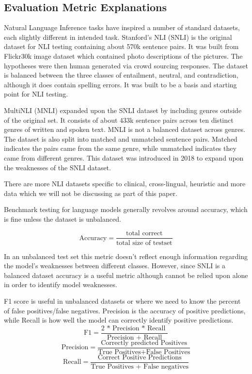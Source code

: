 \documentclass[11pt]{article}
\begin{document}
\subsection{Evaluation Metric Explanations}
Natural Language Inference tasks have inspired a number of standard datasets, each slightly different in intended task.  Stanford's NLI (SNLI) is the original dataset for NLI testing containing about 570k sentence pairs.  It was built from Flickr30k image dataset which contained photo descriptions of the pictures.  The hypotheses were then human generated via crowd sourcing responses. The dataset is balanced between the three classes of entailment, neutral, and contradiction, although it does contain spelling errors.  It was built to be a basis and starting point for NLI testing. \citealp{dataAug}

MultiNLI (MNLI) expanded upon the SNLI dataset by including genres outside of the original set. It consists of about 433k sentence pairs across ten distinct genres of written and spoken text. MNLI is not a balanced dataset across genres. The dataset is also split into matched and unmatched sentence pairs. Matched indicates the pairs came from the same genre, while unmatched indicates they came from different genres.  This dataset was introduced in 2018 to expand upon the weaknesses of the SNLI dataset. \citealp{williams2018broadcoveragechallengecorpussentence}

There are more NLI datasets specific to clinical, cross-lingual, heuristic and more data which we will not be discussing as part of this paper.

Benchmark testing for language models generally revolves around accuracy, which is fine unless the dataset is unbalanced. 

\begin{equation*}
\text{Accuracy} = \frac{\text{total correct}}{\text{total size of testset}}
\end{equation*}

In an unbalanced test set this metric doesn't reflect enough information regarding the model's weaknesses between different classes. However, since SNLI is a balanced dataset accuracy is a useful metric although cannot be relied upon alone in order to identify model weaknesses.

F1 score is useful in unbalanced datasets or where we need to know the percent of false positives/false negatives.  Precision is the accuracy of positive predictions, while Recall is how well the model can correctly identify positive predictions.
\begin{equation*}
\text{F1} = \frac{\text{2 * Precision * Recall }}{\text{Precision + Recall}}
\end{equation*}
\begin{equation*}
\text{Precision} = \frac{\text{Correctly predicted Positives}}{\text{True Positives+False Positives}}
\end{equation*}
\begin{equation*}
\text{Recall} = \frac{\text{Correct Positive Predictions}}{\text{True Positives + False negatives}}
\end{equation*}
\end{document}
